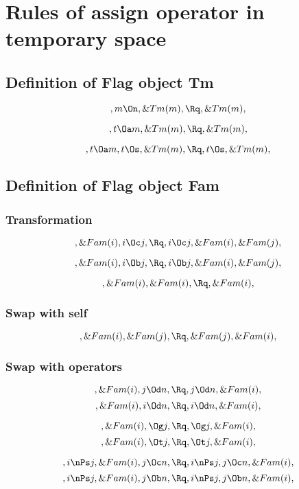 \chapter{Rules of assign operator in temporary space}

\section{Definition of Flag object Tm}

\[, m \On, \&Tm(m), \Rq , \&Tm(m),\]

\[, t \Oa m, \&Tm(m), \Rq , \&Tm(m),\]

\[, t \Oa m, t \Os, \&Tm(m), \Rq , t \Os, \&Tm(m),\]







\bigskip
\bigskip
\section{Definition of Flag object Fam}
\subsection{Transformation}
\[, \&Fam(i), i \Oc j, \Rq , i \Oc j, \&Fam(i), \&Fam(j), \]

\[, \&Fam(i), i \Ob j, \Rq , i \Ob j, \&Fam(i), \&Fam(j), \]



\[, \&Fam(i), \&Fam(i),  \Rq , \&Fam(i),\]



\bigskip
\bigskip
\subsection{Swap with self}
\[, \&Fam(i), \&Fam(j), \Rq , \&Fam(j), \&Fam(i),\]


\bigskip
\bigskip
\subsection{Swap with operators}
\[, \&Fam(i), j \Od n, \Rq , j \Od n, \&Fam(i),\]
\[, \&Fam(i), i \Od n, \Rq , i \Od n, \&Fam(i),\]


\[, \&Fam(i), \Og j, \Rq , \Og j, \&Fam(i),\]
\[, \&Fam(i), \Ot j, \Rq , \Ot j, \&Fam(i),\]



\[,i \nPs j, \&Fam(i), j \Oc n, \Rq ,i \nPs j, j \Oc n, \&Fam(i),\]
\[,i \nPs j, \&Fam(i), j \Ob n, \Rq ,i \nPs j, j \Ob n, \&Fam(i),\]

